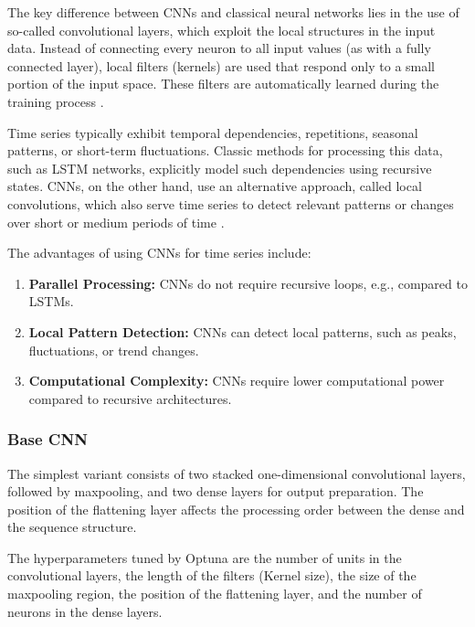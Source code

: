 The key difference between CNNs and classical neural networks lies in the use of so-called convolutional layers, which exploit the local structures in the input data.
Instead of connecting every neuron to all input values (as with a fully connected layer), local filters (kernels) are used that respond only to a small portion of the input space.
These filters are automatically learned during the training process \cite{cnn-for-time-series}.

Time series typically exhibit temporal dependencies, repetitions, seasonal patterns, or short-term fluctuations.
Classic methods for processing this data, such as LSTM networks, explicitly model such dependencies using recursive states.
CNNs, on the other hand, use an alternative approach, called local convolutions, which also serve time series to detect relevant patterns or changes over short or medium periods of time \cite{cnn-local-convolution}.

The advantages of using CNNs for time series include:

\begin{enumerate}
    \item \textbf{Parallel Processing:} CNNs do not require recursive loops, e.g., compared to LSTMs.
    \item \textbf{Local Pattern Detection:} CNNs can detect local patterns, such as peaks, fluctuations, or trend changes.
    \item \textbf{Computational Complexity:} CNNs require lower computational power compared to recursive architectures.
\end{enumerate}

\subsubsection{Base CNN}

The simplest variant consists of two stacked one-dimensional convolutional layers, followed by maxpooling, and two dense layers for output preparation.
The position of the flattening layer affects the processing order between the dense and the sequence structure.

The hyperparameters tuned by Optuna are the number of units in the convolutional layers, the length of the filters (Kernel size), the size of the maxpooling region, the position of the flattening layer, and the number of neurons in the dense layers.



